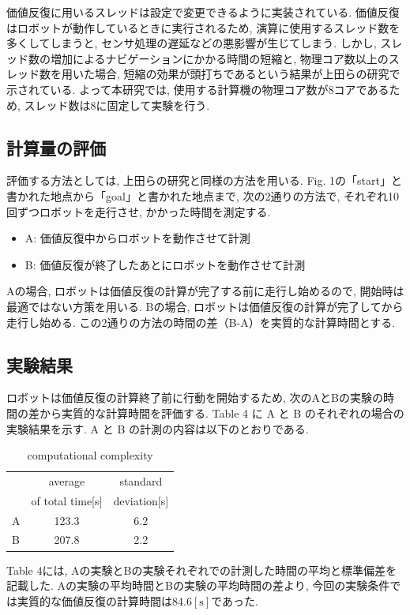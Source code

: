 \documentclass{jarticle}
\begin{document}
価値反復に用いるスレッドは設定で変更できるように実装されている. 
価値反復はロボットが動作しているときに実行されるため, 
演算に使用するスレッド数を多くしてしまうと, センサ処理の遅延などの悪影響が生じてしまう. 
しかし, スレッド数の増加によるナビゲーションにかかる時間の短縮と, 
物理コア数以上のスレッド数を用いた場合, 短縮の効果が頭打ちであるという結果が上田らの研究\cite{上田rsj2021}で示されている. 
よって本研究では, 使用する計算機の物理コア数が8コアであるため, スレッド数は8に固定して実験を行う.
\subsection{計算量の評価}
評価する方法としては, 上田らの研究\cite{上田rsj2021}と同様の方法を用いる. 
Fig. 1の「start」と書かれた地点から「goal」と書かれた地点まで, 
次の2通りの方法で, それぞれ10回ずつロボットを走行させ, かかった時間を測定する.

\begin{itemize}
	\item A: 価値反復中からロボットを動作させて計測
	\item B: 価値反復が終了したあとにロボットを動作させて計測
\end{itemize}

Aの場合, ロボットは価値反復の計算が完了する前に走行し始めるので, 開始時は最適ではない方策を用いる.
Bの場合, ロボットは価値反復の計算が完了してから走行し始める. 
この2通りの方法の時間の差（B-A）を実質的な計算時間とする.
\subsection{実験結果}
ロボットは価値反復の計算終了前に行動を開始するため, 次のAとBの実験の時間の差から実質的な計算時間を評価する. 
Table 4 に A と B のそれぞれの場合の実験結果を示す. 
A と B の計測の内容は以下のとおりである.

\begin{table}[hbtp]
	\caption{computational complexity}
	\centering
	 \begin{tabular}{l|cc}
		\hline
		 & average & standard \\
		 & of total time[s] & deviation[s] \\
		\hline \hline
		A & 123.3 & 6.2 \\
		B & 207.8 & 2.2 \\
		\hline
	 \end{tabular}
 \end{table}

Table 4には, Aの実験とBの実験それぞれでの計測した時間の平均と標準偏差を記載した. 
Aの実験の平均時間とBの実験の平均時間の差より, 今回の実験条件では実質的な価値反復の計算時間は84.6$\mathrm{[s]}$であった.
\end{document}
